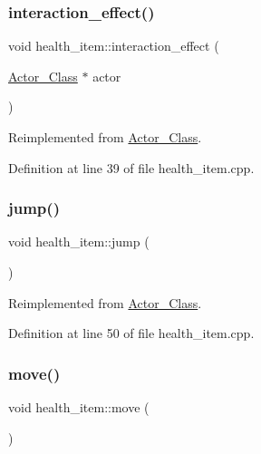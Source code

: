 \subsubsection{\texorpdfstring{interaction\+\_\+effect()}{interaction\_effect()}}
{\footnotesize\ttfamily void health\+\_\+item\+::interaction\+\_\+effect (\begin{DoxyParamCaption}\item[{\hyperlink{class_actor___class}{Actor\+\_\+\+Class} $\ast$}]{actor }\end{DoxyParamCaption})\hspace{0.3cm}{\ttfamily [virtual]}}



Reimplemented from \hyperlink{class_actor___class_af3488ca470eb77255060142fd167aa72}{Actor\+\_\+\+Class}.



Definition at line 39 of file health\+\_\+item.\+cpp.

\hypertarget{classhealth__item_af7e8d841f469ac5e225429aaddb06844}{}\label{classhealth__item_af7e8d841f469ac5e225429aaddb06844} 
\subsubsection{\texorpdfstring{jump()}{jump()}}
{\footnotesize\ttfamily void health\+\_\+item\+::jump (\begin{DoxyParamCaption}{ }\end{DoxyParamCaption})\hspace{0.3cm}{\ttfamily [virtual]}}



Reimplemented from \hyperlink{class_actor___class_ab33216a3ce0c856bdc16231c71ae35c2}{Actor\+\_\+\+Class}.



Definition at line 50 of file health\+\_\+item.\+cpp.

\hypertarget{classhealth__item_a60ce7f7099abb26dcc159fdf115d63eb}{}\label{classhealth__item_a60ce7f7099abb26dcc159fdf115d63eb} 
\subsubsection{\texorpdfstring{move()}{move()}}
{\footnotesize\ttfamily void health\+\_\+item\+::move (\begin{DoxyParamCaption}{ }\end{DoxyParamCaption})\hspace{0.3cm}{\ttfamily [virtual]}}



